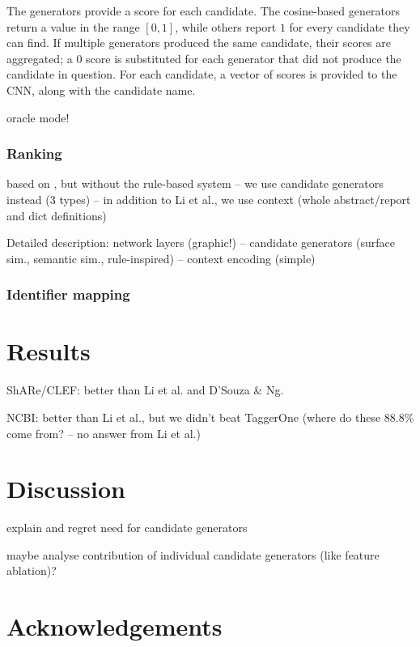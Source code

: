 \documentclass{bioinfo}
\begin{document}
The generators provide a score for each candidate.
The cosine-based generators return a value in the range $[0,1]$, while others report $1$ for every candidate they can find.
If multiple generators produced the same candidate, their scores are aggregated; a $0$ score is substituted for each generator that did not produce the candidate in question.
For each candidate, a vector of scores is provided to the CNN, along with the candidate name.

oracle mode!

\subsubsection{Ranking}
\label{ssub:ranking}

based on \cite{lihaodi-et-al:2017}, but without the rule-based system --
we use candidate generators instead (3 types) --
in addition to Li et al., we use context (whole abstract/report and dict definitions)

Detailed description:
network layers (graphic!) --
candidate generators (surface sim., semantic sim., rule-inspired) --
context encoding (simple)

\subsubsection{Identifier mapping}
\label{ssub:id-mapping}




\section{Results}

ShARe/CLEF: better than Li et al. and D'Souza \& Ng.

NCBI: better than Li et al., but we didn't beat TaggerOne
(where do these 88.8\% come from? -- no answer from Li et al.)



\section{Discussion}

explain and regret need for candidate generators

maybe analyse contribution of individual candidate generators (like feature ablation)?



\section*{Acknowledgements}
\end{document}
